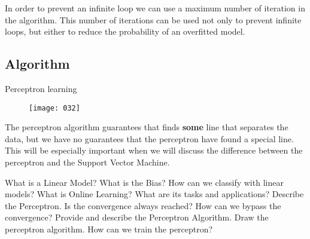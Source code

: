 In order to prevent an infinite loop we can use a maximum number of iteration in the algorithm. This number of iterations can be used not only to prevent infinite loops, but either to reduce the probability of an overfitted model.

\subsection{Algorithm}
\begin{algorithm}[h!]
\caption{Perceptron learning}
\label{alg:perceptron}
\end{algorithm}

\begin{figure}[t]
\begin{center}
    \texttt{[image: 032]}
    \label{fig:032}
\end{center}
\end{figure}

The perceptron algorithm guarantees that finds \textbf{some} line that separates the data, but we have no guarantees that the perceptron have found a special line. This will be especially important when we will discuss the difference between the perceptron and the Support Vector Machine.

\newpage
\begin{exercise}[topsep=20pt,itemsep=10pt]
    \ex What is a Linear Model?
    \ex What is the Bias?
    \ex How can we classify with linear models?
    \ex What is Online Learning? What are its tasks and applications?
    \ex Describe the Perceptron. Is the convergence always reached? How can we bypass the convergence?
    \ex[!] Provide and describe the Perceptron Algorithm.
    \ex[!] Draw the perceptron algorithm. How can we train the perceptron?
\end{exercise}